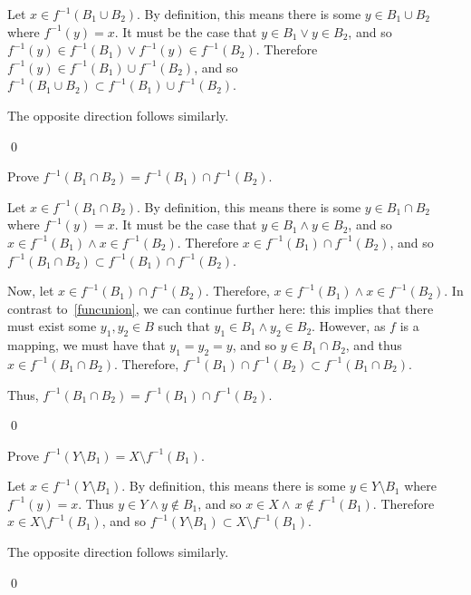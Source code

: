 \begin{exlist}
    Let $x \in f^{-1}(B_1 \cup B_2)$. By definition, this means there is some $y \in B_1 \cup B_2$ where $f^{-1}(y) = x$. It must be the case that $y \in B_1 \lor y \in B_2$, and so $f^{-1}(y) \in f^{-1}(B_1) \lor f^{-1}(y) \in f^{-1}(B_2)$. Therefore $f^{-1}(y) \in f^{-1}(B_1) \cup f^{-1}(B_2)$, and so $f^{-1}(B_1 \cup B_2) \subset f^{-1}(B_1) \cup f^{-1}(B_2)$.

    \medskip

    The opposite direction follows similarly.

    \qed
    \item Prove $f^{-1}(B_1 \cap B_2) = f^{-1}(B_1) \cap f^{-1}(B_2)$.
    \hrlist

    Let $x \in f^{-1}(B_1 \cap B_2)$. By definition, this means there is some $y \in B_1 \cap B_2$ where $f^{-1}(y) = x$. It must be the case that $y \in B_1 \land y \in B_2$, and so $x \in f^{-1}(B_1) \land x \in f^{-1}(B_2)$. Therefore $x \in f^{-1}(B_1) \cap f^{-1}(B_2)$, and so $f^{-1}(B_1 \cap B_2) \subset f^{-1}(B_1) \cap f^{-1}(B_2)$.

    \medskip

    Now, let $x \in f^{-1}(B_1) \cap f^{-1}(B_2)$. Therefore, $x \in f^{-1}(B_1) \land x \in f^{-1}(B_2)$. In contrast to~\ref{funcunion}, we can continue further here: this implies that there must exist some $y_1, y_2 \in B$ such that $y_1 \in B_1 \land y_2 \in B_2$. However, as $f$ is a mapping, we must have that $y_1 = y_2 = y$, and so $y \in B_1 \cap B_2$, and thus $x \in f^{-1}(B_1 \cap B_2)$. Therefore, $f^{-1}(B_1) \cap f^{-1}(B_2) \subset f^{-1}(B_1 \cap B_2)$.

    \medskip

    Thus, $f^{-1}(B_1 \cap B_2) = f^{-1}(B_1) \cap f^{-1}(B_2)$.

    \qed
    \pagebreak
    \item Prove $f^{-1}(Y \setminus B_1) = X \setminus f^{-1}(B_1)$.
    \hrlist

    Let $x \in f^{-1}(Y \setminus B_1)$. By definition, this means there is some $y \in Y \setminus B_1$ where $f^{-1}(y) = x$. Thus $y \in Y \land y \notin B_1$, and so $x \in X \land\,x \notin f^{-1}(B_1)$. Therefore $x \in X \setminus f^{-1}(B_1)$, and so $f^{-1}(Y \setminus B_1) \subset X \setminus f^{-1}(B_1)$.

    \medskip

    The opposite direction follows similarly.

    \qed
\end{exlist}

